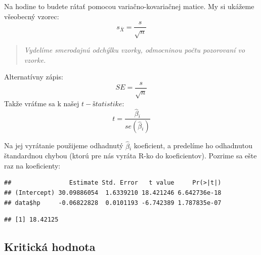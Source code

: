Na hodine to budete rátať pomocou variačno-kovariačnej matice. My si
ukážeme všeobecný vzorec:
\[s_{\bar{X}} = \frac{s}{\sqrt{n}}\]

\begin{quote}
\emph{Vydelíme smerodajnú odchýlku vzorky, odmocninou počtu pozorovaní
vo vzorke.}
\end{quote}

Alternatívny zápis:
\[SE = \frac{s}{\sqrt{n}}\] Takže vráťme sa k našej \(t-štatistike\):
\[t = \frac{\hat\beta{}_i}{se(\hat\beta{}_i)}\]

Na jej vyrátanie použijeme odhadnutý \(\hat\beta{}_i\) koeficient, a
predelíme ho odhadnutou štandardnou chybou (ktorú pre nás vyráta R-ko do
koeficientov). Pozrime sa ešte raz na koeficienty:

\begin{Shaded}
\begin{Highlighting}[]
\OperatorTok{$}
\end{Highlighting}
\end{Shaded}

\begin{verbatim}
##                Estimate Std. Error   t value     Pr(>|t|)
## (Intercept) 30.09886054  1.6339210 18.421246 6.642736e-18
## data$hp     -0.06822828  0.0101193 -6.742389 1.787835e-07
\end{verbatim}

\begin{Shaded}
\begin{Highlighting}[]
\StringTok{ }\OperatorTok{$}\NormalTok{coefficients[}\NormalTok{, }\NormalTok{] }\OperatorTok{/}\StringTok{ }
          \OperatorTok{$}\NormalTok{coefficients[}\NormalTok{, }\NormalTok{]}
\end{Highlighting}
\end{Shaded}

\begin{verbatim}
## [1] 18.42125
\end{verbatim}

\hypertarget{kritickuxe1-hodnota}{%
\subsection{Kritická hodnota}\label{kritickuxe1-hodnota}}

